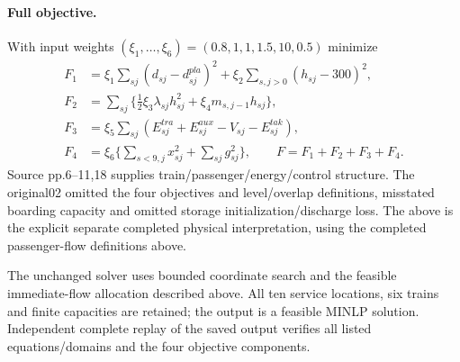 \documentclass[11pt]{article}
\begin{document}
\paragraph{Full objective.}
With input weights $(\xi_1,\ldots,\xi_6)=(0.8,1,1,1.5,10,0.5)$ minimize
\begin{align}
F_1&=\xi_1\sum_{sj}(d_{sj}-d^{pla}_{sj})^2
       +\xi_2\sum_{s,j>0}(h_{sj}-300)^2,\\
F_2&=\sum_{sj}\{\tfrac12\xi_3\lambda_{sj}h_{sj}^2
                         +\xi_4m_{s,j-1}h_{sj}\},\\
F_3&=\xi_5\sum_{sj}(E^{tra}_{sj}+E^{aux}_{sj}-V_{sj}-E^{tak}_{sj}),\\
F_4&=\xi_6\{\sum_{s<9,j}x_{sj}^2+\sum_{sj}g_{sj}^2\},\qquad
F=F_1+F_2+F_3+F_4.
\end{align}
Source pp.6--11,18 supplies train/passenger/energy/control structure.
The original02 omitted the four objectives and level/overlap definitions,
misstated boarding capacity and omitted storage initialization/discharge loss.
The above is the explicit separate completed physical interpretation,
using the completed passenger-flow definitions above.

The unchanged solver uses bounded coordinate search and the feasible
immediate-flow allocation described above. All ten service locations,
six trains and finite capacities are retained; the output is a feasible MINLP solution. Independent complete replay of the saved output verifies all
listed equations/domains and the four objective components.
\end{document}
